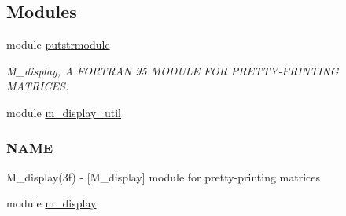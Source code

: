 \subsection*{Modules}
\begin{DoxyCompactItemize}
\item 
module \hyperlink{namespaceputstrmodule}{putstrmodule}
\begin{DoxyCompactList}\small\item\em M\+\_\+display, A F\+O\+R\+T\+R\+AN 95 M\+O\+D\+U\+LE F\+OR P\+R\+E\+T\+T\+Y-\/\+P\+R\+I\+N\+T\+I\+NG M\+A\+T\+R\+I\+C\+ES. \end{DoxyCompactList}\item 
module \hyperlink{namespacem__display__util}{m\+\_\+display\+\_\+util}
\begin{DoxyCompactList}\small\item\em \subsubsection*{N\+A\+ME}

M\+\_\+display(3f) -\/ \mbox{[}M\+\_\+display\mbox{]} module for pretty-\/printing matrices \end{DoxyCompactList}\item 
module \hyperlink{namespacem__display}{m\+\_\+display}
\end{DoxyCompactItemize}
